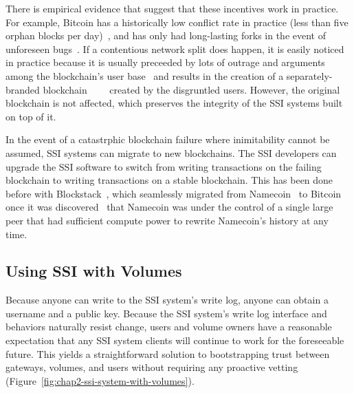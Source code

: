There is empirical evidence that suggest that these incentives work in practice.  For
example, Bitcoin has a historically low conflict rate in practice
(less than five orphan blocks per
day)~\cite{blockchain-info-orphan-rate}, and has only had long-lasting forks in
the event of unforeseen bugs~\cite{bitcoin-deep-fork}.  If a contentious network
split does happen, it is easily noticed in practice because it is usually
preceeded by lots of outrage and arguments among the blockchain's user
base~\cite{bitcoin-controversies} and results in the creation of a
separately-branded
blockchain~\cite{bitcoin-cash}~\cite{ethereum-classic}~\cite{zcash-classic}~\cite{expanse}
created by the disgruntled users.  However, the original blockchain is not
affected, which preserves the integrity of the SSI systems built on top of it.

In the event of a catastrphic blockchain failure where inimitability
cannot be assumed, SSI systems can migrate to new blockchains.  The SSI
developers can upgrade the SSI software to switch from writing transactions on
the failing blockchain to writing transactions on a stable blockchain.  This has
been done before with Blockstack~\cite{blockstack-namecoin-migration}, which
seamlessly migrated from Namecoin~\cite{namecoin} to Bitcoin once it was
discovered~\cite{blockstack} that Namecoin was under the control of a single
large peer that had sufficient compute power to rewrite Namecoin's history
at any time.

\subsection{Using SSI with Volumes}

Because anyone can write to the SSI system's write log, anyone can obtain a
username and a public key.  Because the SSI system's write log interface and
behaviors naturally resist change, users and volume owners have a reasonable
expectation that any SSI system clients will continue to work for the
foreseeable future.  This yields a straightforward solution to bootstrapping
trust between gateways, volumes, and users without requiring any proactive
vetting (Figure~\ref{fig:chap2-ssi-system-with-volumes}).

